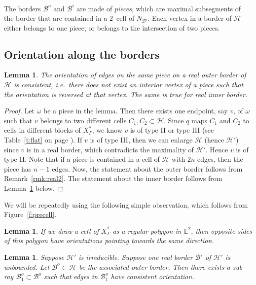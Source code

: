 \documentclass[11pt]{amsart}
\newcommand {\B}{\mathcal B}
\newcommand {\h}{\mathcal H}
\newtheorem{lemma}[theorem]{Lemma}
\theoremstyle{definition}
\newcommand{\Xa}{X^{\ast}}
\begin{document}
The borders $\B^o$ and $\B^i$ are made of \emph{pieces}, which are maximal subsegments of the border that are contained in a $2$--cell of $N_{\B'}$. Each vertex in a border of $\h$ either belongs to one piece, or belongs to the intersection of two pieces.

\subsection{Orientation along the borders}
\begin{lemma}
	\label{lem:piece orient}
The orientation of edges on the same piece on a real outer border of $\h$ is consistent, i.e.\ there does not exist an interior vertex of a piece such that the orientation is reversed at that vertex. The same is true for real inner border.
\end{lemma}

\begin{proof}
Let $\omega$ be a piece in the lemma. Then there exists one endpoint, say $v$, of $\omega$ such that $v$ belongs to two different cells $C_1,C_2\subset\h$. Since $q$ maps $C_1$ and $C_2$ to cells in different blocks of $\Xa_\Gamma$, we know $v$ is of type II or type III (see Table~\ref{t:flat} on page \pageref{t:flat}). If $v$ is of type III, then we can enlarge $\h$ (hence $\h'$) since $v$ is in a real border, which contradicts the maximality of $\h'$. Hence $v$ is of type II. Note that if a piece is contained in a cell of $\h$ with $2n$ edges, then the piece has $n-1$ edges. Now, the statement about the outer border follows from Remark~\ref{rmk:real2}. The statement about the inner border follows from Lemma~\ref{lem:ob} below.
\end{proof}

We will be repeatedly using the following simple observation, which follows from Figure~\ref{f:precell}.

\begin{lemma}
	\label{lem:ob}
If we draw a cell of $\Xa_\Gamma$ as a regular polygon in $\mathbb E^2$, then opposite sides of this polygon have orientations pointing towards the same direction.
\end{lemma}

\begin{lemma}
	\label{lem:real ray border}
Suppose $\h'$ is irreducible. Suppose one real border $\B'$ of $\h'$ is unbounded. Let $\B^o\subset\h$ be the associated outer border. Then there exists a sub-ray $\B^o_1\subset\B^o$ such that edges in $\B^o_1$ have consistent orientation.
\end{lemma}
\end{document}
